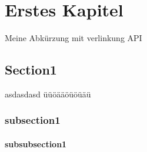 \chapter{Erstes Kapitel}
 Meine Abkürzung mit verlinkung \acs{API}
\lipsum[1-20]

\section{Section1}
asdasdasd
üüöääöüöüäü
\lipsum[21-40]
\subsection{subsection1}
\lipsum[41-50]
\subsubsection{subsubsection1}
\lipsum[51-60]
\cleardoubleemptypage %